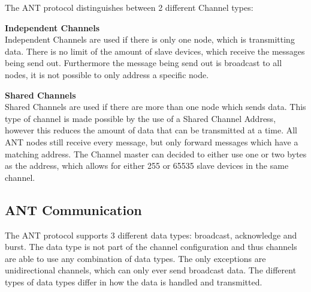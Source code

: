 The ANT protocol distinguishes between 2 different Channel types:
\begin{description}
\item{\textbf{Independent Channels}} \hfill \\ Independent Channels are used if there is only one node, which is transmitting data. There is no limit of the amount of slave devices, which receive the messages being send out. Furthermore the message being send out is broadcast to all nodes, it is not possible to only address a specific node.
\item{\textbf{Shared Channels}} \hfill \\ Shared Channels are used if there are more than one node which sends data. This type of channel is made possible by the use of a Shared Channel Address, however this reduces the amount of data that can be transmitted at a time. All ANT nodes still receive every message, but only forward messages which have a matching address. The Channel master can decided to either use one or two bytes as the address, which allows for either 255 or 65535 slave devices in the same channel. 
\end{description}

\subsection{ANT Communication}

The ANT protocol supports 3 different data types: broadcast, acknowledge and burst. The data type is not part of the channel configuration and thus channels are able to use any combination of data types. The only exceptions are unidirectional channels, which can only ever send broadcast data. The different types of data types differ in how the data is handled and transmitted.

